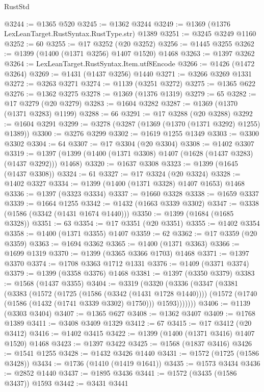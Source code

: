 \begin{lexlean}{RustStd}
\begin{coremodule}
@3244 := @1365 @520
@3245 := @1362 @3244
@3249 := @1369 (@1376 LexLeanTarget.RustSyntax.RustType.str) @1389
@3251 := @3245 @3249 @1160
@3252 := 60
@3255 := @17 @3252 (@20 @3252)
@3256 := @1445 @3255
@3262 := @1399 (@1400 (@1371 @3256) @1407 @1520) @1468
@3263 := @1397 @3262
@3264 := LexLeanTarget.RustSyntax.Item.utf8Encode
@3266 := @1426 (@1472 @3264)
@3269 := @1431 (@1437 @3256) @1440
@3271 := @3266 @3269 @1331
@3272 := @3263 @3271
@3274 := @1139 (@3251 @3272)
@3275 := @1365 @622
@3276 := @1362 @3275
@3278 := @1369 (@1376 @1319)
@3279 := 65
@3282 := @17 @3279 (@20 @3279)
@3283 := @1604 @3282
@3287 := @1369 (@1370 (@1371 @3283) @1199)
@3288 := 66
@3291 := @17 @3288 (@20 @3288)
@3292 := @1604 @3291
@3299 := @3278 (@3287 (@1369 (@1370 (@1371 @3292) @1255) @1389))
@3300 := @3276 @3299
@3302 := @1619 @1255 @1349
@3303 := @3300 @3302
@3304 := 64
@3307 := @17 @3304 (@20 @3304)
@3308 := @1402 @3307
@3319 := @1397 (@1399 (@1400 (@1371 @3308) @1407 (@1628 (@1437 @3283) (@1437 @3292))) @1468)
@3320 := @1637 @3308
@3323 := @1399 (@1645 (@1437 @3308))
@3324 := 61
@3327 := @17 @3324 (@20 @3324)
@3328 := @1402 @3327
@3334 := @1399 (@1400 (@1371 @3328) @1407 @1653) @1468
@3336 := @1397 (@3323 @3334)
@3337 := @1660 @3328
@3338 := @1659 @3337
@3339 := @1664 @1255
@3342 := @1432 (@1663 @3339 @3302)
@3347 := @3338 (@1586 (@3342 (@1431 @1674 @1440)))
@3350 := @1399 (@1684 (@1685 @3328))
@3351 := 63
@3354 := @17 @3351 (@20 @3351)
@3355 := @1402 @3354
@3358 := @1400 (@1371 @3355) @1407
@3359 := 62
@3362 := @17 @3359 (@20 @3359)
@3363 := @1694 @3362
@3365 := @1400 (@1371 @3363)
@3366 := @1699 @1319
@3370 := @1399 (@3365 @3366 @1703) @1468
@3371 := @1397 @3370
@3374 := @1708 @3363 @1712 @1331
@3376 := @1409 (@3371 @3374)
@3379 := @1399 (@3358 @3376) @1468
@3381 := @1397 (@3350 @3379)
@3383 := @1568 (@1437 @3355)
@3404 := @3319
    (@3320
      (@3336
        (@3347
          (@3381
            (@3383
              (@1572
                (@1725 (@1586 (@3342 (@1431 @1728 @1440))))
                (@1572 (@1740 (@1586 (@1432 (@1741 @3339 @3302) @1750))) @1593)))))))
@3406 := @1139 (@3303 @3404)
@3407 := @1365 @627
@3408 := @1362 @3407
@3409 := @1768 @1389
@3411 := @3408 @3409 @1329
@3412 := 67
@3415 := @17 @3412 (@20 @3412)
@3416 := @1402 @3415
@3422 := @1399 (@1400 (@1371 @3416) @1407 @1520) @1468
@3423 := @1397 @3422
@3425 := @1568 (@1837 @3416)
@3426 := @1541 @1255
@3428 := @1432 @3426 @1440
@3431 := @1572 (@1725 (@1586 @3428))
@3434 := @1736 (@1410 (@1419 @1641))
@3435 := @1573 @3434
@3436 := @2852 @1440
@3437 := @1895 @3436
@3441 := @1572 (@3435 (@1586 @3437)) @1593
@3442 := @3431 @3441

\end{coremodule}
\end{lexlean}
